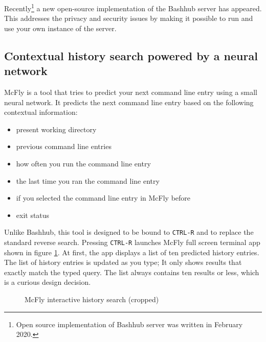Recently\footnote{Open source implementation of Bashhub server was written in February 2020.} a new open-source implementation\cite{toolsbashhubserver} of the Bashhub server has appeared. This addresses the privacy and security issues by making it possible to run and use your own instance of the server.


\subsection{Contextual history search powered by a neural network}

McFly\cite{toolsmcfly} is a tool that tries to predict your next command line entry using a small neural network. It predicts the next command line entry based on the following contextual information:
\begin{itemize}
    \item present working directory
    \item previous command line entries
    \item how often you run the command line entry
    \item the last time you ran the command line entry
    \item if you selected the command line entry in McFly before
    \item exit status
\end{itemize}

Unlike Bashhub, this tool is designed to be bound to \verb|CTRL-R| and to replace the standard reverse search. Pressing \verb|CTRL-R| launches McFly full screen terminal app shown in figure \ref{tools-mcfly}. At first, the app displays a list of ten predicted history entries. The list of history entries is updated as you type; It only shows results that exactly match the typed query. The list always contains ten results or less, which is a curious design decision. 


\begin{figure}[h]
  \caption{McFly interactive history search (cropped)}
  \label{tools-mcfly}
\end{figure}


